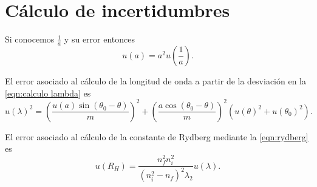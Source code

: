 \documentclass[12pt]{article}
\numberwithin{table}{section}
\numberwithin{figure}{section}
\numberwithin{equation}{section}
\begin{document}
\printbibliography

\appendix
\section{Cálculo de incertidumbres}
Si conocemos \( \frac{1}{a} \) y su error entonces
\begin{equation}\label{eqn:error separacion}
	u(a) = a^2 u\left(\frac{1}{a}\right).
\end{equation}

El error asociado al cálculo de la longitud de onda a partir de la desviación en la \cref{eqn:calculo lambda} es
\begin{equation} \label{eqn:error lambda}
	u(\lambda)^2 = \left(\frac{u(a)\sin{(\theta_0 - \theta)}}{m}\right)^2 + \left(\frac{a\cos{(\theta_0 - \theta)}}{m}\right)^2 (u(\theta)^2 + u(\theta_0)^2).
\end{equation}

El error asociado al cálculo de la constante de Rydberg mediante la \cref{eqn:rydberg} es
\begin{equation} \label{eqn:error rydberg}
	u(R_H) = \frac{n_f^2n_i^2}{(n_i^2 - n_f)^2 \lambda_2} u(\lambda).
\end{equation}


\newpage
\end{document}
